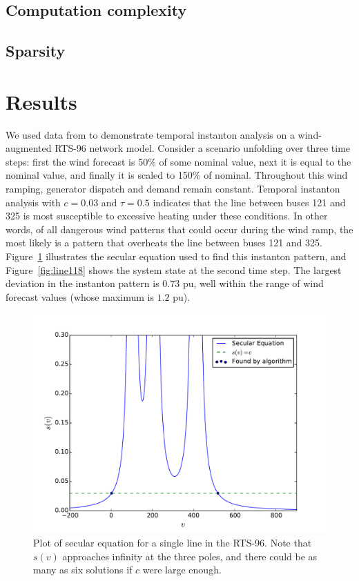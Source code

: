 \documentclass[conference]{IEEEtran}
\begin{document}
\subsection{Computation complexity}

\subsection{Sparsity}

\section{Results}\label{sec:results}

We used data from \cite{pandzic} to demonstrate temporal instanton
analysis on a wind-augmented RTS-96 network model. Consider a scenario
unfolding over three time steps: first the wind forecast is 50\% of
some nominal value, next it is equal to the nominal value, and finally
it is scaled to 150\% of nominal. Throughout this wind ramping,
generator dispatch and demand remain constant. Temporal instanton
analysis with $c=0.03$ and $\tau=0.5$ indicates that the line between
buses 121 and 325 is most susceptible to excessive heating under these
conditions. In other words, of all dangerous wind patterns that could
occur during the wind ramp, the most likely is a pattern that
overheats the line between buses 121 and 325. Figure~\ref{fig:secular}
illustrates the secular equation used to find this instanton pattern,
and Figure~\ref{fig:line118} shows the system state at the second time
step. The largest deviation in the instanton pattern is $0.73$ pu,
well within the range of wind forecast values (whose maximum is $1.2$
pu).


\begin{figure}[t]
\centering
\includegraphics[trim=0in 0in 0.5in 0.5in,clip,width=1\linewidth]{images/secular}
\caption{Plot of secular equation for a single line in the RTS-96. Note that $s(v)$ approaches infinity at the three poles, and there could be as many as six solutions if $c$ were large enough.}	
\label{fig:secular}
\end{figure}
\end{document}
